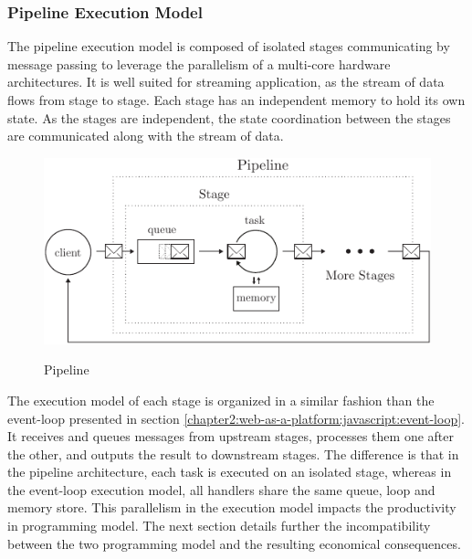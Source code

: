 \subsubsection{Pipeline Execution Model}

The pipeline execution model is composed of isolated stages communicating by message passing to leverage the parallelism of a multi-core hardware architectures.
It is well suited for streaming application, as the stream of data flows from stage to stage.
Each stage has an independent memory to hold its own state.
As the stages are independent, the state coordination between the stages are communicated along with the stream of data.

\begin{figure}[h!]
  \centering
  \includegraphics[width=0.8\linewidth]{../resources/pipeline.pdf}
  \label{fig:pipeline}
  \caption{Pipeline}
\end{figure}

The execution model of each stage is organized in a similar fashion than the event-loop presented in section \ref{chapter2:web-as-a-platform:javascript:event-loop}.
It receives and queues messages from upstream stages, processes them one after the other, and outputs the result to downstream stages.
The difference is that in the pipeline architecture, each task is executed on an isolated stage, whereas in the event-loop execution model, all handlers share the same queue, loop and memory store.
This parallelism in the execution model impacts the productivity in programming model.
The next section details further the incompatibility between the two programming model and the resulting economical consequences.

